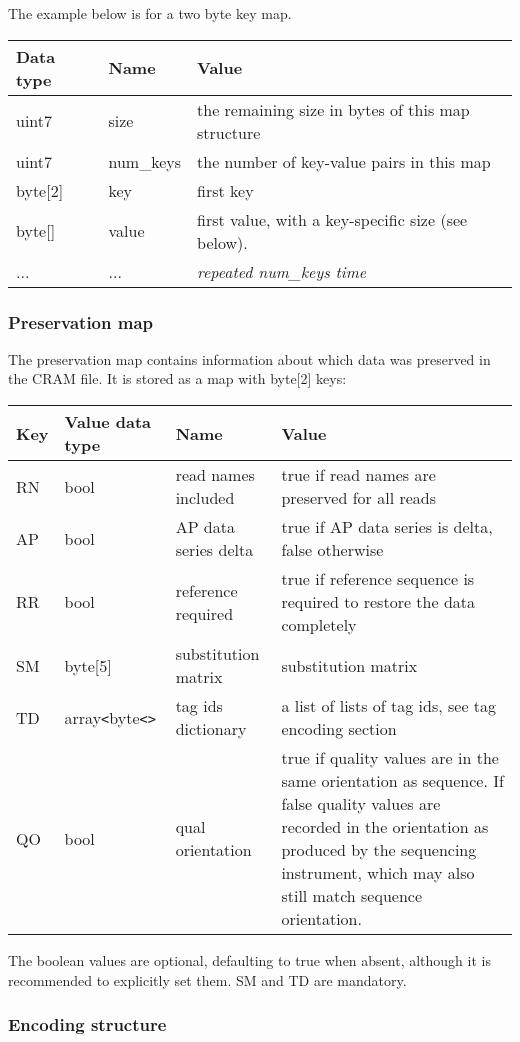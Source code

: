 \documentclass[a4paper]{article}
\begin{document}
The example below is for a two byte key map.

\begin{tabular}{|l|>{\raggedright}p{120pt}|>{\raggedright}p{260pt}|}
\hline
\textbf{Data type} & \textbf{Name} & \textbf{Value}
\tabularnewline
\hline
uint7 & size & the remaining size in bytes of this map structure\tabularnewline
\hline
uint7 & num\_keys & the number of key-value pairs in this map\tabularnewline
\hline
byte[2] & key & first key\tabularnewline
\hline
byte[] & value & first value, with a key-specific size (see below).\tabularnewline
\hline
... & ... & \textit{repeated num\_keys time}\tabularnewline
\hline
\end{tabular}


\subsubsection{Preservation map}

The preservation map contains information about which data was preserved in the 
CRAM file. It is stored as a map with byte[2] keys:

\begin{tabular}{|l|l|>{\raggedright}p{100pt}|>{\raggedright}p{220pt}|}
\hline
\textbf{Key} & \textbf{Value data type} & \textbf{Name} & \textbf{Value}\tabularnewline
\hline
RN & bool & read names included & true if read names are preserved for all reads\tabularnewline
\hline
AP & bool & AP data series delta & true if AP data series is delta, false otherwise\tabularnewline
\hline
RR & bool & reference required & true if reference sequence is required to restore 
the data completely\tabularnewline
\hline
SM & byte[5] & substitution matrix & substitution matrix\tabularnewline
\hline
TD & array\texttt{<}byte\texttt{<>} & tag ids dictionary & a list of lists of tag ids, see tag encoding 
section\tabularnewline
\hline
QO & bool & qual orientation & true if quality values are in the same orientation as sequence.  If false quality values are recorded in the orientation as produced by the sequencing instrument, which may also still match sequence orientation.\tabularnewline
\hline
\end{tabular}

The boolean values are optional, defaulting to true when absent, although it is recommended to explicitly set them.  SM and TD are mandatory.

\subsubsection{Encoding structure}
\end{document}
